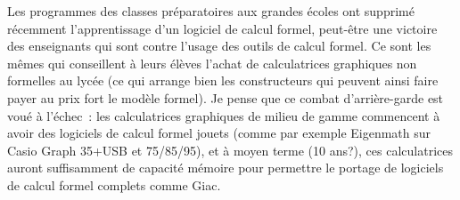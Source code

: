 \documentclass[a4paper,11pt]{article}
\begin{document}
\begin{giacjshere}
Les programmes des classes pr\'eparatoires aux grandes \'ecoles
ont supprim\'e r\'ecemment l'apprentissage d'un logiciel de calcul
formel, peut-\^etre une victoire des enseignants qui sont contre
l'usage des outils de calcul formel. Ce sont les m\^emes qui conseillent
\`a leurs \'el\`eves l'achat de calculatrices graphiques non formelles
au lyc\'ee (ce qui arrange bien les constructeurs qui peuvent ainsi
faire payer au prix fort le mod\`ele formel). 
Je pense que ce combat d'arri\`ere-garde est vou\'e \`a l'\'echec~:
les calculatrices graphiques de milieu de gamme commencent
\`a avoir des logiciels de calcul formel jouets (comme
par exemple Eigenmath sur Casio Graph 35+USB et 75/85/95),
et \`a moyen terme (10 ans?), ces calculatrices 
auront suffisamment de capacit\'e m\'emoire pour
permettre le portage de logiciels de calcul formel complets comme Giac.


\end{giacjshere}
\end{document}
